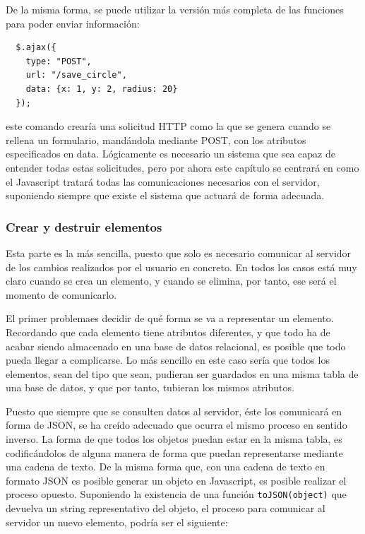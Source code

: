 De la misma forma, se puede utilizar la versión más completa de las funciones para poder enviar información:

\begin{verbatim}
  $.ajax({
    type: "POST",
    url: "/save_circle",
    data: {x: 1, y: 2, radius: 20}
  });
\end{verbatim} 

este comando crearía una solicitud HTTP como la que se genera cuando se rellena un formulario, mandándola mediante POST, con los atributos especificados en data. Lógicamente es necesario un sistema que sea capaz de entender todas estas solicitudes, pero por ahora este capítulo se centrará en como el Javascript tratará todas las comunicaciones necesarios con el servidor, suponiendo siempre que existe el sistema que actuará de forma adecuada.

\newpage
\subsubsection{Crear y destruir elementos} %
\label{ssub:crear_y_destruir_elementos}

Esta parte es la más sencilla, puesto que solo es necesario comunicar al servidor de los cambios realizados por el usuario en concreto. En todos los casos está muy claro cuando se crea un elemento, y cuando se elimina, por tanto, ese será el momento de comunicarlo. 

El primer problemaes decidir de qué forma se va a representar un elemento. Recordando que cada elemento tiene atributos diferentes, y que todo ha de acabar siendo almacenado en una base de datos relacional, es posible que todo pueda llegar a complicarse. Lo más sencillo en este caso sería que todos los elementos, sean del tipo que sean, pudieran ser guardados en una misma tabla de una base de datos, y que por tanto, tubieran los mismos atributos.

Puesto que siempre que se consulten datos al servidor, éste los comunicará en forma de JSON, se ha creído adecuado que ocurra el mismo proceso en sentido inverso. La forma de que todos los objetos puedan estar en la misma tabla, es codificándolos de alguna manera de forma que puedan representarse mediante una cadena de texto. De la misma forma que, con una cadena de texto en formato JSON es posible generar un objeto en Javascript, es posible realizar el proceso opuesto. Suponiendo la existencia de una función \texttt{toJSON(object)} que devuelva un string representativo del objeto, el proceso para comunicar al servidor un nuevo elemento, podría ser el siguiente:

